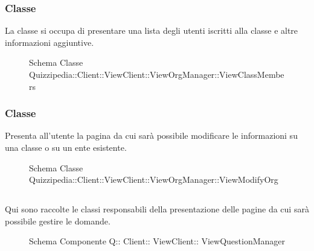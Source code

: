 \subsubsection{Classe }
La classe si occupa di presentare una lista degli utenti iscritti alla classe e altre informazioni aggiuntive.
\begin{figure}[H]
\centering
\noindent{}
\caption[Schema Classe ViewClassMembers]{Schema Classe Quizzipedia::Client::ViewClient::ViewOrgManager::ViewClassMembers}
\end{figure}
\subsubsection{Classe }
Presenta all'utente la pagina da cui sarà possibile modificare le informazioni su una classe o su un ente esistente.
\begin{figure}[H]
\centering
\noindent{}
\caption[Schema Classe ViewModifyOrg]{Schema Classe Quizzipedia::Client::ViewClient::ViewOrgManager::ViewModifyOrg}
\end{figure}
\subsection{}
Qui sono raccolte le classi responsabili della presentazione delle pagine da cui sarà possibile gestire le domande.
\begin{figure}[H]
\centering
\noindent{}
\caption[Schema Componente Quizzipedia::Client::ViewClient::ViewQuestionManager]{Schema Componente Q:: Client:: ViewClient:: ViewQuestionManager}
\end{figure}
